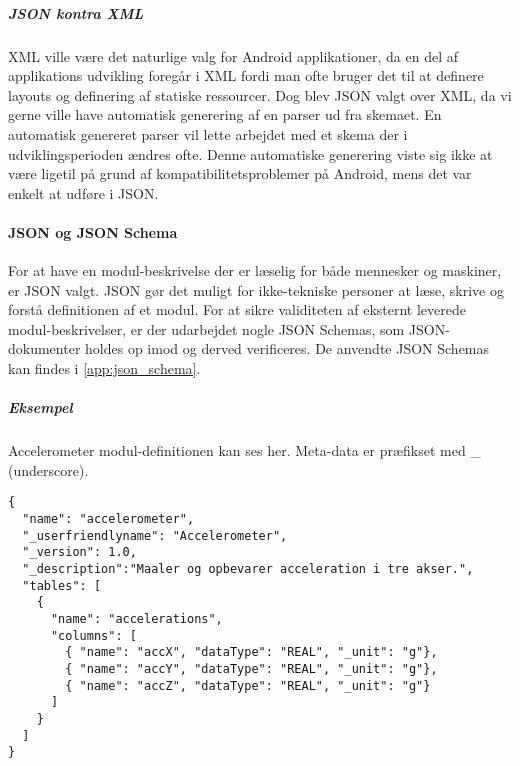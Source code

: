 \subparagraph{JSON kontra XML}
XML ville være det naturlige valg for Android applikationer, da en del af applikations udvikling foregår i XML fordi man ofte bruger det til at definere layouts og definering af statiske ressourcer. 
Dog blev JSON valgt over XML, da vi gerne ville have automatisk generering af en parser ud fra skemaet.
En automatisk genereret parser vil lette arbejdet med et skema der i udviklingsperioden ændres ofte.
Denne automatiske generering viste sig ikke at være ligetil på grund af kompatibilitetsproblemer på Android, mens det var enkelt at udføre i JSON.

\paragraph{JSON og JSON Schema}
For at have en modul-beskrivelse der er læselig for både mennesker og maskiner, er JSON valgt.
JSON gør det muligt for ikke-tekniske personer at læse, skrive og forstå definitionen af et modul.
For at sikre validiteten af eksternt leverede modul-beskrivelser, er der udarbejdet nogle JSON Schemas, som JSON-dokumenter holdes op imod og derved verificeres.
De anvendte JSON Schemas kan findes i \cref{app:json_schema}.

\subparagraph{Eksempel} Accelerometer modul-definitionen kan ses her.
Meta-data er præfikset med \_ (underscore).
\begin{lstlisting}
{
  "name": "accelerometer",
  "_userfriendlyname": "Accelerometer",
  "_version": 1.0,
  "_description":"Maaler og opbevarer acceleration i tre akser.",
  "tables": [
    {
      "name": "accelerations",
      "columns": [
        { "name": "accX", "dataType": "REAL", "_unit": "g"},
        { "name": "accY", "dataType": "REAL", "_unit": "g"},
        { "name": "accZ", "dataType": "REAL", "_unit": "g"}
      ]
    }
  ]
}
\end{lstlisting}